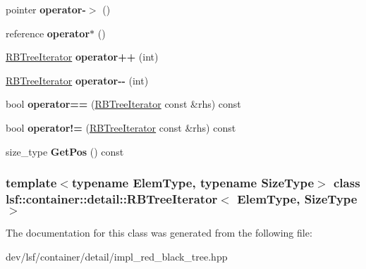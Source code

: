 \begin{DoxyCompactItemize}
\item 
\hypertarget{classlsf_1_1container_1_1detail_1_1RBTreeIterator_a19bf82f399fb929575d09c4aacc59d60}{
pointer {\bfseries operator-\/$>$} ()}
\label{classlsf_1_1container_1_1detail_1_1RBTreeIterator_a19bf82f399fb929575d09c4aacc59d60}

\item 
\hypertarget{classlsf_1_1container_1_1detail_1_1RBTreeIterator_a8f6a58857275485c4cdc898aa5f7dbef}{
reference {\bfseries operator$\ast$} ()}
\label{classlsf_1_1container_1_1detail_1_1RBTreeIterator_a8f6a58857275485c4cdc898aa5f7dbef}

\item 
\hypertarget{classlsf_1_1container_1_1detail_1_1RBTreeIterator_ad57edd5d7eec399c96037b52cd7d1de3}{
\hyperlink{classlsf_1_1container_1_1detail_1_1RBTreeIterator}{RBTreeIterator} {\bfseries operator++} (int)}
\label{classlsf_1_1container_1_1detail_1_1RBTreeIterator_ad57edd5d7eec399c96037b52cd7d1de3}

\item 
\hypertarget{classlsf_1_1container_1_1detail_1_1RBTreeIterator_adbf6b34776c025c5b3940e001158cb32}{
\hyperlink{classlsf_1_1container_1_1detail_1_1RBTreeIterator}{RBTreeIterator} {\bfseries operator-\/-\/} (int)}
\label{classlsf_1_1container_1_1detail_1_1RBTreeIterator_adbf6b34776c025c5b3940e001158cb32}

\item 
\hypertarget{classlsf_1_1container_1_1detail_1_1RBTreeIterator_aff06d06eb0bb1c5570695e1c8188b493}{
bool {\bfseries operator==} (\hyperlink{classlsf_1_1container_1_1detail_1_1RBTreeIterator}{RBTreeIterator} const \&rhs) const }
\label{classlsf_1_1container_1_1detail_1_1RBTreeIterator_aff06d06eb0bb1c5570695e1c8188b493}

\item 
\hypertarget{classlsf_1_1container_1_1detail_1_1RBTreeIterator_a358e56681bf0d469140a2563494df16f}{
bool {\bfseries operator!=} (\hyperlink{classlsf_1_1container_1_1detail_1_1RBTreeIterator}{RBTreeIterator} const \&rhs) const }
\label{classlsf_1_1container_1_1detail_1_1RBTreeIterator_a358e56681bf0d469140a2563494df16f}

\item 
\hypertarget{classlsf_1_1container_1_1detail_1_1RBTreeIterator_a1414b82315fe3c2107a1e8108cc27a65}{
size\_\-type {\bfseries GetPos} () const }
\label{classlsf_1_1container_1_1detail_1_1RBTreeIterator_a1414b82315fe3c2107a1e8108cc27a65}

\end{DoxyCompactItemize}
\subsubsection*{template$<$typename ElemType, typename SizeType$>$ class lsf::container::detail::RBTreeIterator$<$ ElemType, SizeType $>$}



The documentation for this class was generated from the following file:\begin{DoxyCompactItemize}
\item 
dev/lsf/container/detail/impl\_\-red\_\-black\_\-tree.hpp\end{DoxyCompactItemize}
